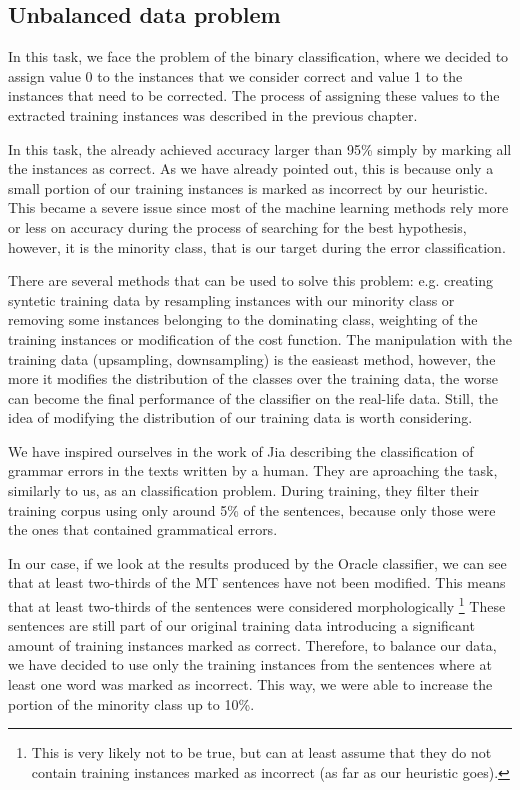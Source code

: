 \subsection{Unbalanced data problem}

In this task, we face the problem of the binary classification, where we decided
to assign value 0 to the instances that we consider correct and value 1 to the
instances that need to be corrected. The process of assigning these values to the
extracted training instances was described in the previous chapter. 

In this task, the  already achieved accuracy larger than 95\%
simply by marking all the instances as correct.
As we have already pointed out, this is because only a small portion of our
training instances is marked as incorrect by our heuristic.
This became a severe issue since most of the machine learning methods rely more or less on accuracy during
the process of searching for the best hypothesis, however, it is the minority
class, that is our target during the error classification.

There are several methods that can be used to solve this problem: e.g. creating syntetic
training data by resampling instances with our minority class or removing some instances
belonging to the dominating class, weighting of the training instances or modification of the
cost function. The manipulation with the training data (upsampling, downsampling) is the easieast method,
however, the more it modifies the distribution of the classes over the training data, the worse can become the final
performance of the classifier on the real-life data. Still, the idea of modifying the distribution
of our training data is worth considering.

We have inspired ourselves in the work of Jia describing the classification of grammar errors in the texts
written by a human\cite{biblio:ZaPoHiddenMarkov2009}. They are aproaching the task, similarly to us, as an classification
problem. During training, they filter their training corpus using only around 5\% of
the sentences, because only those were the ones that contained grammatical errors.

In our case, if we look at the results produced by the Oracle classifier, we can see that at least
two-thirds of the MT sentences have not been modified. This means that at least two-thirds of the sentences
were considered morphologically \footnote{This is very likely not to be true, but can at least assume
that they do not contain training instances marked as incorrect (as far as our heuristic goes).}
These sentences are still part of our original training data introducing a significant amount of training
instances marked as correct.
Therefore, to balance our data, we have decided to use only the training
instances from the sentences where at least one word was marked as incorrect. This way, we were
able to increase the portion of the minority class up to 10\%.

